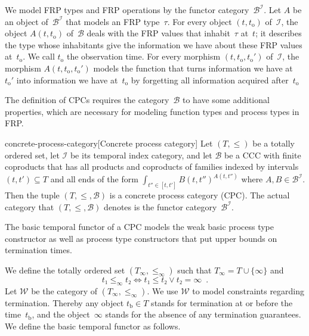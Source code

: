\documentclass[copyright,creativecommons]{eptcs}
\newcommand{\timebound}{t_{\mathrm b}}
\newcommand{\obstime}{t_{\mathrm o}}
\begin{document}
We model FRP types and FRP operations by the functor category~$ℬ^ℐ$. Let $A$ be
an object of~$ℬ^ℐ$ that models an FRP type~$τ$. For every object $(t, \obstime)$
of~$ℐ$, the object $A(t, \obstime)$ of~$ℬ$ deals with the FRP values that
inhabit~$τ$ at~$t$; it describes the type whose inhabitants give the information
we have about these FRP values at~$\obstime$. We call $\obstime$ the observation
time. For every morphism $\left(t, \obstime, \obstime′\right)$ of~$ℐ$, the
morphism $A\left(t, \obstime, \obstime′\right)$ models the function that turns
information we have at~$\obstime′$ into information we have at~$\obstime$ by
forgetting all information acquired after~$\obstime$

The definition of CPCs requires the category~$ℬ$ to have some additional
properties, which are necessary for modeling function types and process types in
FRP.

\begin{extdefinition}{concrete-process-category}[Concrete process category]
Let $(T, ≤)$ be a totally ordered set, let $ℐ$ be its temporal index category,
and let $ℬ$ be a CCC with finite coproducts that has all products and coproducts
of families indexed by intervals $(t, t′) ⊆ T$ and all ends of the form $∫_{t″ ∈
[t, t′]} B(t, t″)^{A\left(t, t″\right)}$ where $A, B ∈ ℬ^ℐ$. Then the tuple $(T,
≤, ℬ)$ is a concrete process category (CPC). The actual category that $(T, ≤,
ℬ)$ denotes is the functor category~$ℬ^ℐ$.
\end{extdefinition}


The basic temporal functor of a CPC \cite[Subsection~4.3]{jeltsch:plpv-2014}
models the weak basic process type constructor as well as process type
constructors that put upper bounds on termination times.

We define the totally ordered set $(T_∞, ≤_∞)$ such that $T_∞ = T ∪ \{∞\}$ and
\begin{equation*}
t₁ ≤_∞ t₂ ⇔ t₁ ≤ t₂ ∨ t₂ = ∞\enspace.
\end{equation*}
Let $𝒲$ be the category of $(T_∞, ≤_∞)$. We use $𝒲$ to model constraints
regarding termination. Thereby any object $\timebound ∈ T$ stands for
termination at or before the time~$\timebound$, and the object~$∞$ stands for
the absence of any termination guarantees. We define the basic temporal functor
as follows.
\end{document}
